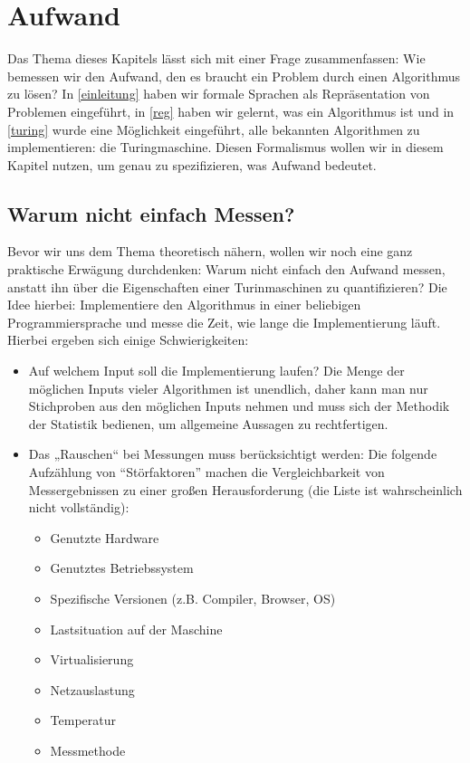 \chapter{Aufwand}
Das Thema dieses Kapitels lässt sich mit einer Frage zusammenfassen:
Wie bemessen wir den Aufwand,
den es braucht ein Problem durch einen Algorithmus zu lösen?
In \autoref{einleitung} haben wir formale Sprachen als Repräsentation von Problemen eingeführt,
in \autoref{reg} haben wir gelernt, was ein Algorithmus ist und
in \autoref{turing} wurde eine Möglichkeit eingeführt,
alle bekannten Algorithmen zu implementieren:
die Turingmaschine.
Diesen Formalismus wollen wir in diesem Kapitel nutzen,
um genau zu spezifizieren,
was Aufwand bedeutet.

\section{Warum nicht einfach Messen?}\label{messenVsBeweisen}

Bevor wir uns dem Thema theoretisch nähern,
wollen wir noch eine ganz praktische Erwägung durchdenken:
Warum nicht einfach den Aufwand messen,
anstatt ihn über die Eigenschaften einer Turinmaschinen zu quantifizieren?
Die Idee hierbei:
Implementiere den Algorithmus in einer beliebigen Programmiersprache
und messe die Zeit,
wie lange die Implementierung läuft.
Hierbei ergeben sich einige Schwierigkeiten:
\begin{itemize}
  \item Auf welchem Input soll die Implementierung laufen?
      Die Menge der möglichen Inputs vieler Algorithmen ist unendlich,
      daher kann man nur Stichproben aus den möglichen Inputs nehmen
        und muss sich der Methodik der Statistik bedienen,
        um allgemeine Aussagen zu rechtfertigen.
    \item Das „Rauschen“ bei Messungen muss berücksichtigt werden:
        Die folgende Aufzählung von ``Störfaktoren'' machen
        die Vergleichbarkeit von Messergebnissen zu einer
        großen Herausforderung (die Liste ist wahrscheinlich nicht vollständig):
      \begin{itemize}
          \item Genutzte Hardware
          \item Genutztes Betriebssystem
          \item Spezifische Versionen (z.B. Compiler, Browser, OS)
          \item Lastsituation auf der Maschine
          \item Virtualisierung
          \item Netzauslastung
          \item Temperatur
          \item Messmethode
      \end{itemize}
\end{itemize}

